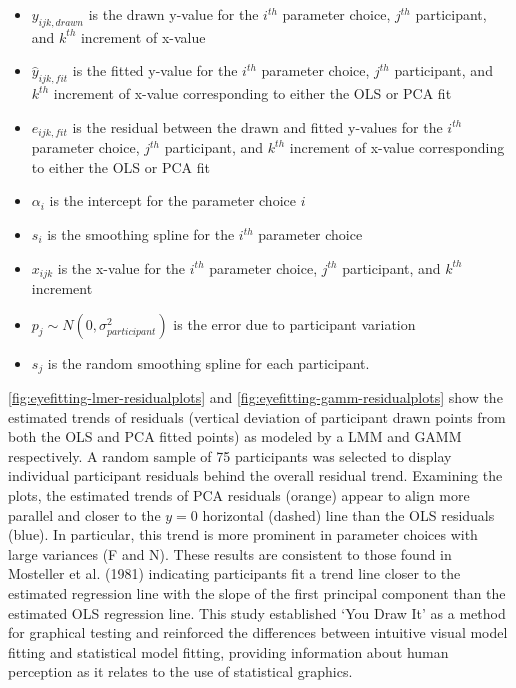 \documentclass[print]{nuthesis}
\providecommand{\tightlist}{%
  \setlength{\itemsep}{0pt}\setlength{\parskip}{0pt}}
\begin{document}
\begin{itemize}
\tightlist
\item
  \(y_{ijk,drawn}\) is the drawn y-value for the \(i^{th}\) parameter choice, \(j^{th}\) participant, and \(k^{th}\) increment of x-value
\item
  \(\hat y_{ijk,fit}\) is the fitted y-value for the \(i^{th}\) parameter choice, \(j^{th}\) participant, and \(k^{th}\) increment of x-value corresponding to either the OLS or PCA fit
\item
  \(e_{ijk,fit}\) is the residual between the drawn and fitted y-values for the \(i^{th}\) parameter choice, \(j^{th}\) participant, and \(k^{th}\) increment of x-value corresponding to either the OLS or PCA fit
\item
  \(\alpha_i\) is the intercept for the parameter choice \(i\)
\item
  \(s_{i}\) is the smoothing spline for the \(i^{th}\) parameter choice
\item
  \(x_{ijk}\) is the x-value for the \(i^{th}\) parameter choice, \(j^{th}\) participant, and \(k^{th}\) increment
\item
  \(p_{j} \sim N(0, \sigma^2_{participant})\) is the error due to participant variation
\item
  \(s_{j}\) is the random smoothing spline for each participant.
\end{itemize}

\cref{fig:eyefitting-lmer-residualplots} and \cref{fig:eyefitting-gamm-residualplots} show the estimated trends of residuals (vertical deviation of participant drawn points from both the OLS and PCA fitted points) as modeled by a LMM and GAMM respectively.
A random sample of 75 participants was selected to display individual participant residuals behind the overall residual trend.
Examining the plots, the estimated trends of PCA residuals (orange) appear to align more parallel and closer to the \(y=0\) horizontal (dashed) line than the OLS residuals (blue).
In particular, this trend is more prominent in parameter choices with large variances (F and N).
These results are consistent to those found in Mosteller et al. (1981) indicating participants fit a trend line closer to the estimated regression line with the slope of the first principal component than the estimated OLS regression line.
This study established `You Draw It' as a method for graphical testing and reinforced the differences between intuitive visual model fitting and statistical model fitting, providing information about human perception as it relates to the use of statistical graphics.
\end{document}
